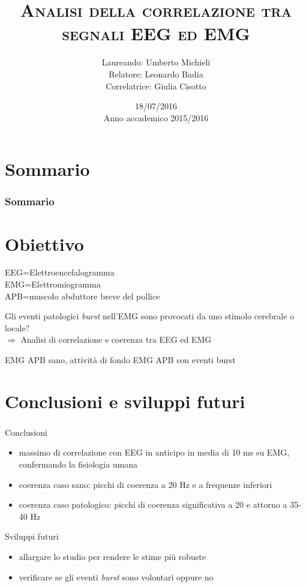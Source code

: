 \documentclass[]{beamer}
\title[Correlation analysis of EEG and EMG]{\textsc{Analisi della correlazione tra segnali EEG ed EMG}}
\author[Umberto Michieli]{Laureando: Umberto Michieli\\Relatore: Leonardo Badia\\Correlatrice: Giulia Cisotto}
\date[18/07/2016]{18/07/2016\\Anno accademico 2015/2016}
\institute[]{Corso di Laurea in Ingegneria dell'Informazione\\ Dipartimento di Ingegneria dell'Informazione}
\begin{document}


\frame{\titlepage} %


\section*{Sommario}
\begin{frame} %
\transwipe[direction=0] %
\frametitle{Sommario}
\tableofcontents
\end{frame}


\section{Obiettivo}

\begin{frame}
\transwipe[direction=0]

EEG=Elettroencefalogramma\\
EMG=Elettromiogramma\\
APB=muscolo abduttore breve del pollice
\begin{block}{}
Gli eventi patologici \textit{burst} nell'EMG sono provocati da uno stimolo cerebrale o locale? \\ \textcolor{blu}{$\Longrightarrow$} Analisi di correlazione e coerenza tra EEG ed EMG

\end{block}

EMG APB sano, attività di fondo \quad \quad EMG APB con eventi burst

\end{frame}


\section{Conclusioni e sviluppi futuri}
\begin{frame}
\transwipe[direction=0]
\frametitle{}
\begin{block}{Conclusioni}
\begin{itemize}
\item massimo di correlazione con EEG in anticipo in media di 10 ms su EMG, confermando la fisiologia umana
\item coerenza caso sano: picchi di coerenza a 20 Hz e a frequenze inferiori
\item coerenza caso patologico: picchi di coerenza significativa a 20 e attorno a 35-40 Hz
\end{itemize}
\end{block}

\begin{block}{Sviluppi futuri}
\begin{itemize}
\item allargare lo studio per rendere le stime più robuste
\item verificare se gli eventi \textit{burst} sono volontari oppure no
\end{itemize}
\end{block}
\end{frame}
\end{document}
